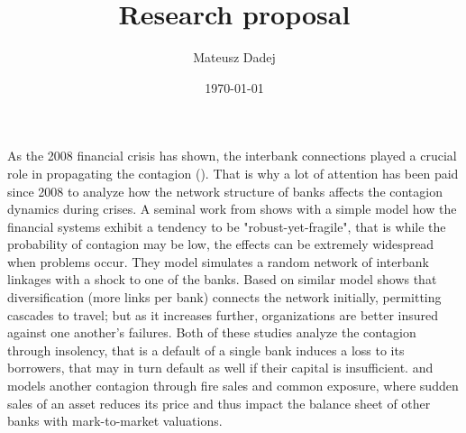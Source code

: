 \documentclass{article}
\title{Research proposal}
\author{Mateusz Dadej}
\date{\today}
\begin{document}
\maketitle
As the 2008 financial crisis has shown, the interbank connections played a crucial role in propagating the contagion (\citet{bruner}). That is why a lot of attention has been paid since 2008 to analyze how the network structure of banks affects the contagion dynamics during crises. A seminal work from \citet{gai} shows with a simple model how the financial systems exhibit a tendency to be "robust-yet-fragile", that is while the probability of contagion may be low, the effects can be extremely widespread
when problems occur. They model simulates a random network of interbank linkages with a shock to one of the banks. Based on similar model \citet{elliot} shows that diversification (more links per bank) connects the network initially, permitting cascades to travel; but as it increases further, organizations are better insured against one another's failures. Both of these studies analyze the contagion through insolency, that is a default of a single bank induces a loss to its borrowers, that may in turn default as well if their capital is insufficient. \citet{Greenwood} and \citet{cifuentes} models another contagion through fire sales and common exposure, where sudden sales of an asset reduces its price and thus impact the balance sheet of other banks with mark-to-market valuations.
\end{document}
